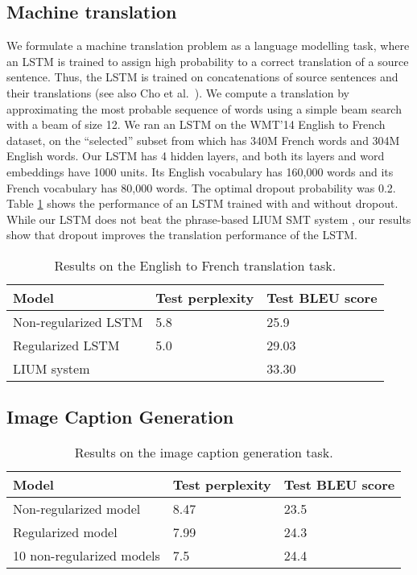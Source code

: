 \documentclass{article} %
\begin{document}
	
	\subsection{Machine translation}
	\label{sec:trans}
	
	We formulate a machine translation problem as a language modelling task, where
	an LSTM is trained to assign high probability to a correct
	translation of a source sentence.  Thus, the LSTM is trained on
	concatenations of source sentences and their translations 
	\cite{sutskever2014sequence} (see also Cho et al.~\cite{cho2014learning}). We compute a translation by 
	approximating the most probable sequence of words
	using a simple beam search with a beam of size 12.  We ran an
	LSTM on the WMT'14 English to French dataset, on the
	``selected'' subset from \cite{wmt_joint} which has 340M French words
	and 304M English words.  Our LSTM has 4 hidden layers, and both its
	layers and word embeddings have 1000 units.  Its 
	English vocabulary has 160,000 words and its French vocabulary has
	80,000 words.  The optimal dropout probability was 0.2.
	Table \ref{tab:mt} shows the performance of an LSTM trained with and without dropout.
	While our LSTM does not beat the phrase-based LIUM SMT system
	\cite{lium}, our results show that dropout improves the
	translation performance of the LSTM.
	
	\begin{table}[t]
		\small
		\centering
		\renewcommand{\arraystretch}{1.15}
		\begin{tabular}{lll}
			\hline
			Model & Test perplexity & Test BLEU score \\
			\hline
			Non-regularized LSTM & 5.8 & 25.9 \\
			Regularized LSTM & 5.0 &  29.03 \\
			\hline
			LIUM system  &  &  33.30 \\
			\hline
		\end{tabular}
		\caption{Results on the English to French translation task. }
		\label{tab:mt}
	\end{table}
	
	\subsection{Image Caption Generation}
	\label{sec:caption}
	
	\begin{table}[th]
		\small
		\centering
		\renewcommand{\arraystretch}{1.15}
		\begin{tabular}{lll}
			\hline
			Model & Test perplexity & Test BLEU score \\
			\hline
			Non-regularized model & 8.47 & 23.5 \\
			Regularized model & 7.99 &  24.3 \\
			\hline
			10 non-regularized models  & 7.5  &  24.4 \\
			\hline
		\end{tabular}
		\caption{Results on the image caption generation task. }
		\label{tab:vis}
	\end{table}
	
\end{document}
